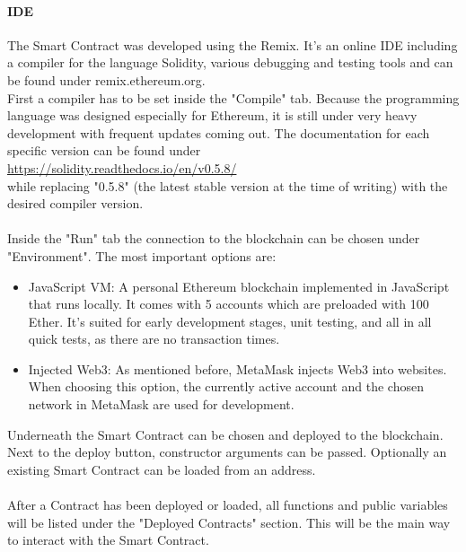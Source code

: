 \paragraph{IDE}
The Smart Contract was developed using the Remix. It’s an online IDE including a compiler for the language Solidity, various debugging and testing tools and can be found under remix.ethereum.org.
\\
First a compiler has to be set inside the "Compile" tab. Because the programming language was designed especially for Ethereum, it is still under very heavy development with frequent updates coming out. The documentation for each specific version can be found under
\\
\url{https://solidity.readthedocs.io/en/v0.5.8/}
\\
while replacing "0.5.8" (the latest stable version at the time of writing) with the desired compiler version.
\\\\
Inside the "Run" tab the connection to the blockchain can be chosen under "Environment". The most important options are:
\begin{itemize}
    \item JavaScript VM: A personal Ethereum blockchain implemented in JavaScript that runs locally. It comes with 5 accounts which are preloaded with 100 Ether. It’s suited for early development stages, unit testing, and all in all quick tests, as there are no transaction times.
    \item Injected Web3: As mentioned before, MetaMask injects Web3 into websites. When choosing this option, the currently active account and the chosen network in MetaMask are used for development.
\end{itemize}
Underneath the Smart Contract can be chosen and deployed to the blockchain. Next to the deploy button, constructor arguments can be passed. Optionally an existing Smart Contract can be loaded from an address.
\\\\
After a Contract has been deployed or loaded, all functions and public variables will be listed under the "Deployed Contracts" section. This will be the main way to interact with the Smart Contract.